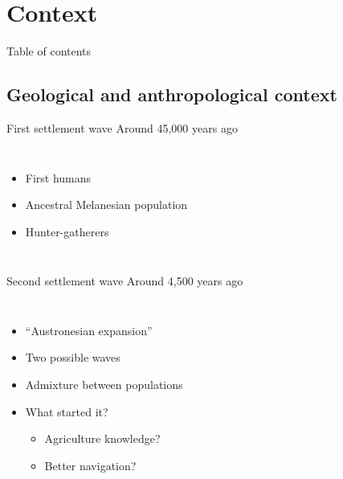 \documentclass[10pt, aspectratio=43]{beamer}
\begin{document}
\section{Context}
\begin{frame}{}{Table of contents}
\tableofcontents[currentsection, subsectionstyle=show/show/hide]
\end{frame}

\subsection{Geological and anthropological context}
\begin{frame}{}{}
\end{frame}

\addtocounter{framenumber}{-1}
\begin{frame}{}{First settlement wave Around 45,000 years ago}
\vspace*{-0.8cm}
\begin{columns}

  \color{masseyWhite}
  \begin{itemize}
    \item First humans
    \item Ancestral Melanesian population
    \item Hunter-gatherers
  \end{itemize}

\end{columns}
\end{frame}

\addtocounter{framenumber}{-1}
\begin{frame}{}{Second settlement wave Around 4,500 years ago}
\vspace*{-0.8cm}
\begin{columns}

  \color{masseyWhite}
  \begin{itemize}
    \item “Austronesian expansion”
    \item Two possible waves
    \item Admixture between populations
    \item What started it?
    \begin{itemize}
      \item Agriculture knowledge?
      \item Better navigation?
    \end{itemize}
  \end{itemize}

\end{columns}
\end{frame}
\end{document}
